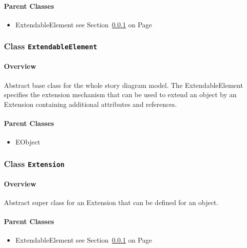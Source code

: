 \paragraph{Parent Classes}
\begin{itemize}
\item ExtendableElement see Section~\ref{cls:core::ExtendableElement} on Page~\pageref{cls:core::ExtendableElement}\end{itemize}
\subsubsection{\Large{Class \bfseries \texttt{ExtendableElement}\normalfont}}
\label{cls:core::ExtendableElement} 
\paragraph{Overview}

	
			
Abstract base class for the whole story diagram model. The ExtendableElement specifies the extension mechanism that can be used to extend an object by an Extension containing additional attributes and references.	
		
	



\paragraph{Parent Classes}
\begin{itemize}
\item EObject \end{itemize}
\subsubsection{\Large{Class \bfseries \texttt{Extension}\normalfont}}
\label{cls:core::Extension} 
\paragraph{Overview}

	
			
Abstract super class for an Extension that can be defined for an object.	
		
	



\paragraph{Parent Classes}
\begin{itemize}
\item ExtendableElement see Section~\ref{cls:core::ExtendableElement} on Page~\pageref{cls:core::ExtendableElement}\end{itemize}
